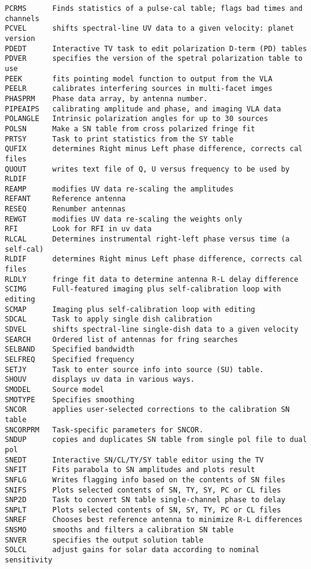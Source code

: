 \begin{verbatim}
PCRMS      Finds statistics of a pulse-cal table; flags bad times and channels
PCVEL      shifts spectral-line UV data to a given velocity: planet version
PDEDT      Interactive TV task to edit polarization D-term (PD) tables
PDVER      specifies the version of the spetral polarization table to use
PEEK       fits pointing model function to output from the VLA
PEELR      calibrates interfering sources in multi-facet imges
PHASPRM    Phase data array, by antenna number.
PIPEAIPS   calibrating amplitude and phase, and imaging VLA data
POLANGLE   Intrinsic polarization angles for up to 30 sources
POLSN      Make a SN table from cross polarized fringe fit
PRTSY      Task to print statistics from the SY table
QUFIX      determines Right minus Left phase difference, corrects cal files
QUOUT      writes text file of Q, U versus frequency to be used by RLDIF
REAMP      modifies UV data re-scaling the amplitudes
REFANT     Reference antenna
RESEQ      Renumber antennas
REWGT      modifies UV data re-scaling the weights only
RFI        Look for RFI in uv data
RLCAL      Determines instrumental right-left phase versus time (a self-cal)
RLDIF      determines Right minus Left phase difference, corrects cal files
RLDLY      fringe fit data to determine antenna R-L delay difference
SCIMG      Full-featured imaging plus self-calibration loop with editing
SCMAP      Imaging plus self-calibration loop with editing
SDCAL      Task to apply single dish calibration
SDVEL      shifts spectral-line single-dish data to a given velocity
SEARCH     Ordered list of antennas for fring searches
SELBAND    Specified bandwidth
SELFREQ    Specified frequency
SETJY      Task to enter source info into source (SU) table.
SHOUV      displays uv data in various ways.
SMODEL     Source model
SMOTYPE    Specifies smoothing
SNCOR      applies user-selected corrections to the calibration SN table
SNCORPRM   Task-specific parameters for SNCOR.
SNDUP      copies and duplicates SN table from single pol file to dual pol
SNEDT      Interactive SN/CL/TY/SY table editor using the TV
SNFIT      Fits parabola to SN amplitudes and plots result
SNFLG      Writes flagging info based on the contents of SN files
SNIFS      Plots selected contents of SN, TY, SY, PC or CL files
SNP2D      Task to convert SN table single-channel phase to delay
SNPLT      Plots selected contents of SN, SY, TY, PC or CL files
SNREF      Chooses best reference antenna to minimize R-L differences
SNSMO      smooths and filters a calibration SN table
SNVER      specifies the output solution table
SOLCL      adjust gains for solar data according to nominal sensitivity

\end{verbatim}
